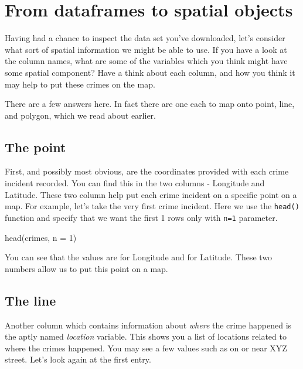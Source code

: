 \documentclass[
]{book}
\newenvironment{Shaded}{\begin{snugshade}}{\end{snugshade}}
\newcommand{\AttributeTok}[1]{\textcolor[rgb]{0.77,0.63,0.00}{#1}}
\newcommand{\DecValTok}[1]{\textcolor[rgb]{0.00,0.00,0.81}{#1}}
\newcommand{\FunctionTok}[1]{\textcolor[rgb]{0.00,0.00,0.00}{#1}}
\newcommand{\NormalTok}[1]{#1}
\begin{document}
\hypertarget{from-dataframes-to-spatial-objects}{%
\section{From dataframes to spatial objects}\label{from-dataframes-to-spatial-objects}}

Having had a chance to inspect the data set you've downloaded, let's consider what sort of spatial information we might be able to use. If you have a look at the column names, what are some of the variables which you think might have some spatial component? Have a think about each column, and how you think it may help to put these crimes on the map.

There are a few answers here. In fact there are one each to map onto point, line, and polygon, which we read about earlier.

\hypertarget{the-point}{%
\subsection{The point}\label{the-point}}

First, and possibly most obvious, are the coordinates provided with each crime incident recorded. You can find this in the two columns - Longitude and Latitude. These two column help put each crime incident on a specific point on a map. For example, let's take the very first crime incident. Here we use the \texttt{head()} function and specify that we want the first 1 rows only with \texttt{n=1} parameter.

\begin{Shaded}
\begin{Highlighting}[]
\FunctionTok{head}\NormalTok{(crimes, }\AttributeTok{n =} \DecValTok{1}\NormalTok{)}
\end{Highlighting}
\end{Shaded}

You can see that the values are for Longitude and for Latitude. These two numbers allow us to put this point on a map.

\hypertarget{the-line}{%
\subsection{The line}\label{the-line}}

Another column which contains information about \emph{where} the crime happened is the aptly named \emph{location} variable. This shows you a list of locations related to where the crimes happened. You may see a few values such as on or near XYZ street. Let's look again at the first entry.
\end{document}
